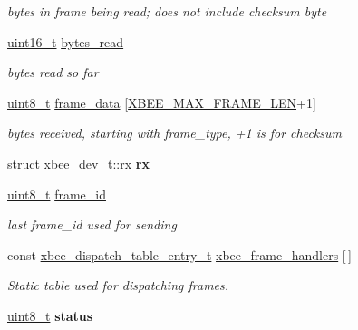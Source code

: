 \begin{DoxyCompactItemize}
\begin{DoxyCompactList}\small\item\em bytes in frame being read; does not include checksum byte \end{DoxyCompactList}\item 
\hypertarget{group__xbee__device_gad7b2ae5814cb8706ab662a5d67e4837a}{\hyperlink{group__hal_ga5a8b2dc9e45a9ee81a94ef304fb62505}{uint16\-\_\-t} \hyperlink{group__xbee__device_gad7b2ae5814cb8706ab662a5d67e4837a}{bytes\-\_\-read}}\label{group__xbee__device_gad7b2ae5814cb8706ab662a5d67e4837a}

\begin{DoxyCompactList}\small\item\em bytes read so far \end{DoxyCompactList}\item 
\hypertarget{group__xbee__device_gaa172073584adf9e2f74034489f9cd2a4}{\hyperlink{group__hal_gae1affc9ca37cfb624959c866a73f83c2}{uint8\-\_\-t} \hyperlink{group__xbee__device_gaa172073584adf9e2f74034489f9cd2a4}{frame\-\_\-data} \mbox{[}\hyperlink{group__xbee__device_gad842f3c5f8d2264a99ab67a01054323a}{X\-B\-E\-E\-\_\-\-M\-A\-X\-\_\-\-F\-R\-A\-M\-E\-\_\-\-L\-E\-N}+1\mbox{]}}\label{group__xbee__device_gaa172073584adf9e2f74034489f9cd2a4}

\begin{DoxyCompactList}\small\item\em bytes received, starting with frame\-\_\-type, +1 is for checksum \end{DoxyCompactList}\item 
\hypertarget{group__xbee__device_ga43dd406313bf0281f9a7b9a6c1555fc6}{struct \hyperlink{structxbee__dev__t_1_1rx}{xbee\-\_\-dev\-\_\-t\-::rx} {\bfseries rx}}\label{group__xbee__device_ga43dd406313bf0281f9a7b9a6c1555fc6}

\item 
\hypertarget{group__xbee__device_ga03c1016ac46b9df250b994f242cf956a}{\hyperlink{group__hal_gae1affc9ca37cfb624959c866a73f83c2}{uint8\-\_\-t} \hyperlink{group__xbee__device_ga03c1016ac46b9df250b994f242cf956a}{frame\-\_\-id}}\label{group__xbee__device_ga03c1016ac46b9df250b994f242cf956a}

\begin{DoxyCompactList}\small\item\em last frame\-\_\-id used for sending \end{DoxyCompactList}\item 
const \hyperlink{structxbee__dispatch__table__entry__t}{xbee\-\_\-dispatch\-\_\-table\-\_\-entry\-\_\-t} \hyperlink{group__xbee__device_ga1a91a1dc6e99737715fbf882842872c5}{xbee\-\_\-frame\-\_\-handlers} \mbox{[}$\,$\mbox{]}
\begin{DoxyCompactList}\small\item\em Static table used for dispatching frames. \end{DoxyCompactList}\item 
\hypertarget{group__xbee__device_gade818037fd6c985038ff29656089758d}{\hyperlink{group__hal_gae1affc9ca37cfb624959c866a73f83c2}{uint8\-\_\-t} {\bfseries status}}\label{group__xbee__device_gade818037fd6c985038ff29656089758d}

\end{DoxyCompactItemize}
